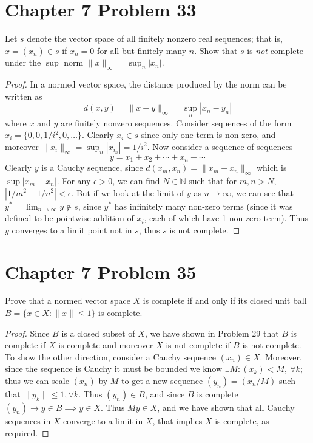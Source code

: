 \documentclass{article}
\newtheorem{proof}{Proof}
\def\le{\leqslant}
\def\to{\rightarrow}
\def\NN{\mathbb N}
\begin{document}
\section{Chapter 7 Problem 33}
Let $s$ denote the vector space of all finitely nonzero real sequences;
that is, $x=(x_n)\in s$ if $x_n=0$ for all but finitely many $n$. Show
that $s$ is \emph{not} complete under the $\sup$ norm 
$\| x\|_\infty = \sup_n|x_n|$.
\begin{proof}
In a normed vector space, the distance produced by the norm
can be written as
\[
d(x,y) = \| x-y\|_\infty = \sup_n | x_n - y_n|
\]
where $x$ and $y$ are finitely nonzero sequences.
Consider sequences of the form $x_i=\{0,0,1/i^2,0,\ldots\}$.
Clearly $x_i\in s$ since only one term is non-zero, and moreover
$\|x_i\|_\infty=\sup_n |x_{i_n}|=1/i^2$. 
Now consider a sequence of sequences
\[
y = x_1 + x_2 + \cdots + x_n + \cdots
\]
Clearly $y$ is a Cauchy sequence, since $d(x_m,x_n)=\|x_m-x_n\|_\infty$
which is $\sup|x_m-x_n|$. For any $\epsilon>0$, we can find
$N\in \NN$ such that for $m,n>N$, $|1/m^2 - 1/n^2|<\epsilon$. But if
we look at the limit of $y$ as $n\to\infty$, we can see that 
$y^*=\lim_{n\to\infty} y\not\in s$, 
since $y^*$ has infinitely many non-zero terms (since it was defined
to be pointwise addition of $x_i$, each of which have 1 non-zero term).
Thus $y$ converges to a limit point not in $s$, thus $s$ is not complete. 


\end{proof}
\section{Chapter 7 Problem 35} Prove that a normed vector space $X$
is complete if and only if its closed unit ball $B=\{x\in X:\|x\| \le 1\}$
is complete.
\begin{proof}
Since $B$ is a closed subset of $X$, we have shown in Problem 29 that
$B$ is complete if $X$ is complete and moreover $X$
is not complete if $B$ is not complete. 
To show the other direction, 
consider a Cauchy sequence $(x_n)\in X$.
Moreover, since the sequence is Cauchy it must be bounded we 
know $\exists M: (x_k)< M, \ \forall k$; thus we can scale $(x_n)$ by $M$
to get a new sequence $(y_n)=(x_n/M)$ such that $\|y_k\|\le 1, \forall k$.
Thus $(y_n)\in B$, and since $B$ is complete $(y_n)\to y\in B\implies y\in X$.
Thus $My\in X$, and we have shown that all Cauchy sequences in $X$
converge to a limit in $X$, that implies $X$ is complete, as required.
\end{proof}
\end{document}

